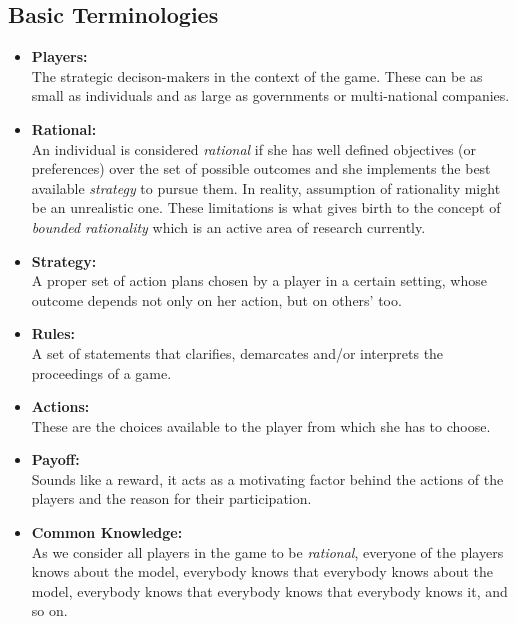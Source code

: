 \subsection{Basic Terminologies}
	\begin{itemize}
	\item \textbf{Players:}\\
	The strategic decison-makers in the context of the game. These can be as small as individuals and as large as governments or multi-national companies.
	\item \textbf{Rational:}\\
		An individual is considered \textit{rational} if she has well defined objectives (or preferences) over the set of possible outcomes and she implements the best available \textit{strategy} to pursue them. In reality, assumption of rationality might be an unrealistic one. These limitations is what gives birth to the concept of \textit{bounded rationality} which is an active area of research currently.
	\item \textbf{Strategy:}\\
	A proper set of action plans chosen by a player in a certain setting, whose outcome depends not only on her action, but on others' too.
	\item \textbf{Rules:}\\
	A set of statements that clarifies, demarcates and/or interprets the proceedings of a game.  
	\item \textbf{Actions:}\\
	These are the choices available to the player from which she has to choose.
	\item \textbf{Payoff:}\\
	Sounds like a reward, it acts as a motivating factor behind the actions of the players and the reason for their participation.
	\item \textbf{Common Knowledge:}\\
	As we consider all players in the game to be \textit{rational}, everyone of the players knows about the model, everybody knows that everybody knows about the model, everybody knows that everybody knows that everybody knows it, and so on.
	\end{itemize}